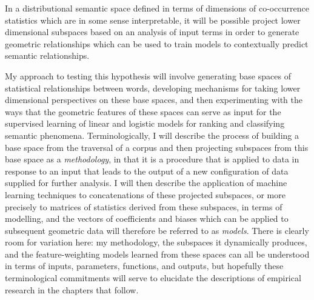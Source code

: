 \begin{quoting}
\noindent In a distributional semantic space defined in terms of dimensions of co-occurrence statistics which are in some sense interpretable, it will be possible project lower dimensional subspaces based on an analysis of input terms in order to generate geometric relationships which can be used to train models to contextually predict semantic relationships.
\end{quoting}

My approach to testing this hypothesis will involve generating base spaces of statistical relationships between words, developing mechanisms for taking lower dimensional perspectives on these base spaces, and then experimenting with the ways that the geometric features of these spaces can serve as input for the supervised learning of linear and logistic models for ranking and classifying semantic phenomena.  Terminologically, I will describe the process of building a base space from the traversal of a corpus and then projecting subspaces from this base space as a \emph{methodology}, in that it is a procedure that is applied to data in response to an input that leads to the output of a new configuration of data supplied for further analysis.  I will then describe the application of machine learning techniques to concatenations of these projected subspaces, or more precisely to matrices of statistics derived from these subspaces, in terms of modelling, and the vectors of coefficients and biases which can be applied to subsequent geometric data will therefore be referred to as \emph{models}.  There is clearly room for variation here: my methodology, the subspaces it dynamically produces, and the feature-weighting models learned from these spaces can all be understood in terms of inputs, parameters, functions, and outputs, but hopefully these terminological commitments will serve to elucidate the descriptions of empirical research in the chapters that follow.

